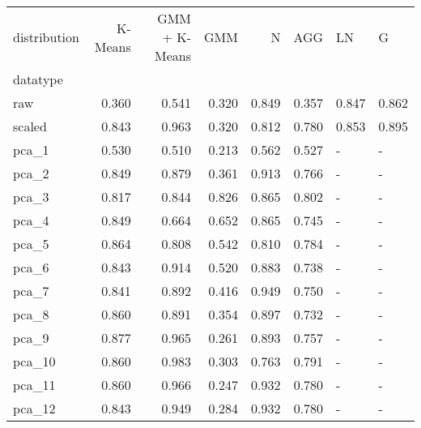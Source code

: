 \begin{tabular}{lrrrrrll}
\toprule
distribution &  K-Means &  GMM + K-Means &    GMM &      N &    AGG &     LN &      G \\
datatype &          &                &        &        &        &        &        \\
\midrule
raw      &    0.360 &          0.541 &  0.320 &  0.849 &  0.357 &  0.847 &  0.862 \\
scaled   &    0.843 &          0.963 &  0.320 &  0.812 &  0.780 &  0.853 &  0.895 \\
pca\_1    &    0.530 &          0.510 &  0.213 &  0.562 &  0.527 &      - &      - \\
pca\_2    &    0.849 &          0.879 &  0.361 &  0.913 &  0.766 &      - &      - \\
pca\_3    &    0.817 &          0.844 &  0.826 &  0.865 &  0.802 &      - &      - \\
pca\_4    &    0.849 &          0.664 &  0.652 &  0.865 &  0.745 &      - &      - \\
pca\_5    &    0.864 &          0.808 &  0.542 &  0.810 &  0.784 &      - &      - \\
pca\_6    &    0.843 &          0.914 &  0.520 &  0.883 &  0.738 &      - &      - \\
pca\_7    &    0.841 &          0.892 &  0.416 &  0.949 &  0.750 &      - &      - \\
pca\_8    &    0.860 &          0.891 &  0.354 &  0.897 &  0.732 &      - &      - \\
pca\_9    &    0.877 &          0.965 &  0.261 &  0.893 &  0.757 &      - &      - \\
pca\_10   &    0.860 &          0.983 &  0.303 &  0.763 &  0.791 &      - &      - \\
pca\_11   &    0.860 &          0.966 &  0.247 &  0.932 &  0.780 &      - &      - \\
pca\_12   &    0.843 &          0.949 &  0.284 &  0.932 &  0.780 &      - &      - \\
\bottomrule
\end{tabular}
